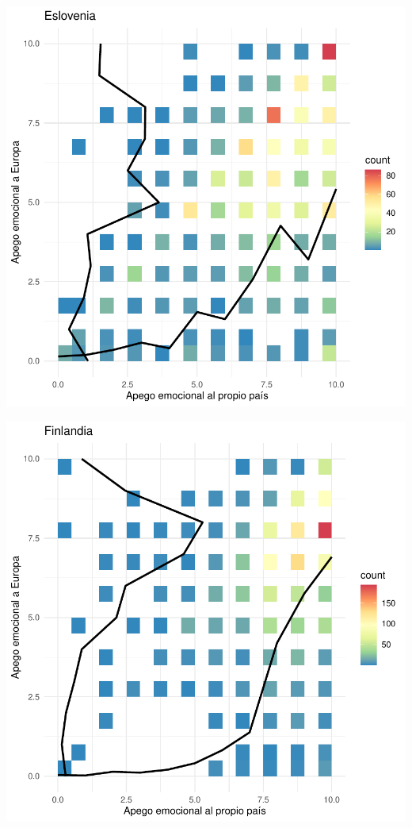 \documentclass{article}
\begin{document}
\includegraphics{Informe-016}

\includegraphics{Informe-017}
\end{document}
